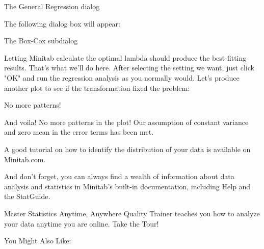 The General Regression dialog


The following dialog box will appear: 


The Box-Cox subdialog


Letting Minitab calculate the optimal lambda should produce the best-fitting results. That's what we'll do here.  After selecting the setting we want, just click "OK" and run the regression analysis as you normally would. Let's produce another plot to see if the transformation fixed the problem:


No more patterns!


And voila! No more patterns in the plot! Our assumption of constant variance and zero mean in the error terms has been met.

A good tutorial on how to identify the distribution of your data is available on Minitab.com. 

And don't forget, you can always find a wealth of information about data analysis and statistics in Minitab's built-in documentation, including Help and the StatGuide.


 

Master Statistics Anytime, Anywhere
Quality Trainer teaches you how to analyze your data anytime you are online.
Take the Tour!


 
You Might Also Like:


